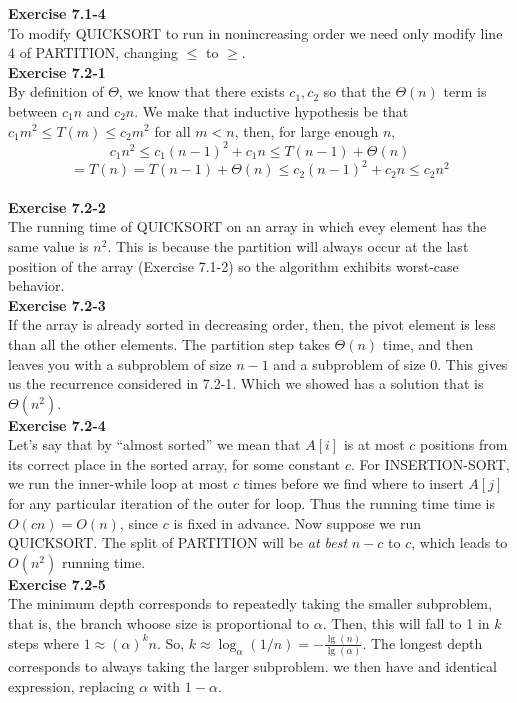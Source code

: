 \documentclass{article}
\begin{document}
\noindent\textbf{Exercise 7.1-4}\\

To modify QUICKSORT to run in nonincreasing order we need only modify line 4 of PARTITION, changing $\leq$ to $\geq$. \\

\noindent\textbf{Exercise 7.2-1}\\
By definition of $\Theta$, we know that there exists $c_1,c_2$ so that the $\Theta(n)$ term is between $c_1 n$ and $c_2 n$. We make that inductive hypothesis be that $c_1 m^2 \le T(m) \le c_2 m^2$ for all $m < n$, then, for large enough $n$, 
\[c_1 n^2 \le c_1 (n-1)^2 + c_1 n \le T(n-1) + \Theta(n)\] \[= T(n) = T(n-1) + \Theta(n) \le c_2 (n-1)^2 +c_2 n \le c_2 n^2\]\\


\noindent\textbf{Exercise 7.2-2}\\

The running time of QUICKSORT on an array in which evey element has the same value is $n^2$.  This is because the partition will always occur at the last position of the array (Exercise 7.1-2) so the algorithm exhibits worst-case behavior. \\

\noindent\textbf{Exercise 7.2-3}\\
If the array is already sorted in decreasing order, then, the pivot element is less than all the other elements. The partition step takes $\Theta(n)$ time, and then leaves you with a subproblem of size $n-1$ and a subproblem of size 0. This gives us the recurrence considered in 7.2-1. Which we showed has a solution that is $\Theta(n^2)$.\\

\noindent\textbf{Exercise 7.2-4}\\

Let's say that by ``almost sorted'' we mean that $A[i]$ is at most $c$ positions from its correct place in the sorted array, for some constant $c$. For INSERTION-SORT, we run the inner-while loop at most $c$ times before we find where to insert $A[j]$ for any particular iteration of the outer for loop.  Thus the running time time is $O(cn) = O(n)$, since $c$ is fixed in advance.  Now suppose we run QUICKSORT.  The split of PARTITION will be \emph{at best} $n-c$ to $c$, which leads to $O(n^2)$ running time. \\

\noindent\textbf{Exercise 7.2-5}\\
The minimum depth corresponds to repeatedly taking the smaller subproblem, that is, the branch whoose size is proportional to $\alpha$. Then, this will fall to 1 in $k$ steps where $1 \approx (\alpha)^k n$. So, $k \approx \log_{\alpha}(1/n) = - \frac{\lg(n)}{\lg(\alpha)} $. The longest depth corresponds to always taking the larger subproblem. we then have and identical expression, replacing $\alpha$ with $1-\alpha$.\\
\end{document}
